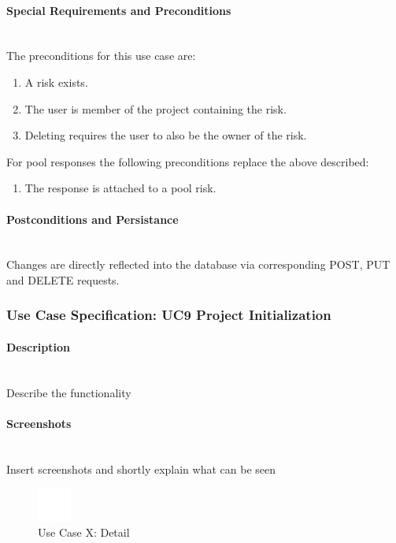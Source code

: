 \paragraph*{Special Requirements and Preconditions}\mbox{}\\
The preconditions for this use case are:
\begin{enumerate}
	\vspace{-3mm}
	\setlength\itemsep{-1em}
	\item  A risk exists.
	\item The user is member of the project containing the risk.
	\item Deleting requires the user to also be the owner of the risk.
\end{enumerate}
For pool responses the following preconditions replace the above described:
\begin{enumerate}
	\vspace{-3mm}
	\setlength\itemsep{-1em}
	\item The response is attached to a pool risk.
\end{enumerate}

\paragraph*{Postconditions and Persistance}\mbox{}\\
Changes are directly reflected into the database via corresponding POST, PUT and DELETE requests.

\newpage
\subsubsection{Use Case Specification: \ac{UC}9 Project Initialization}
\label{sec:domainBbj}

\paragraph*{Description}\mbox{}\\
Describe the functionality

\paragraph*{Screenshots}\mbox{}\\
Insert screenshots and shortly explain what can be seen
\begin{figure}[h] 
	\centering
	\includegraphics[width=0.1\textwidth]{Content/Domain/placeholder.png}
	\caption{Use Case X: Detail}
	\label{fig:label9}
\end{figure}

